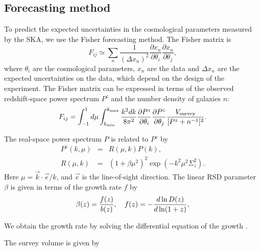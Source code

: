 \documentclass[useAMS,usenatbib]{mn2e}
\begin{document}
\subsection{Forecasting method}

To predict the expected uncertainties in the cosmological parameters measured by the SKA, we use the Fisher forecasting method.
 The Fisher matrix is
\begin{equation}
 F_{ij} \simeq \sum_n \frac{1}{(\Delta x_n)^2}\frac{\partial
    x_n}{\partial \theta_i}\frac{\partial x_n}{\partial
  \theta_j} ,
\end{equation}
where $\theta_i$ are the cosmological parameters, $x_n$ are the data and $\Delta {x_n}$ are  the expected uncertainties on the data, which  depend on the design of the experiment.
The Fisher matrix  can be expressed in terms of the observed redshift-space power spectrum $P^z$ and the number density of galaxies $n$:
\begin{eqnarray}  
F_{ij}=
\int_{-1}^{1}d\mu \int_{k_{\rm min}}^{{k_{\rm max}}} {k^2dk\over 8\pi^2} \frac{\partial  P^z}{\partial \theta_i} \frac{\partial P^z}{\partial \theta_j}
{V_{\rm survey}\over [P^z+n^{-1}]^2}.
 \label{eq:Fij}
\end{eqnarray}

The real-space power spectrum $P$ is related to $P^z$ by
\begin{eqnarray}
P^z(k,\mu)&=& R(\mu,k)P(k),\\
R(\mu,k)& =& (1+\beta\mu^2)^2\exp{\left(-k^2\mu^2\Sigma_z^2 \right)}.\label{eq:Rsig}
\end{eqnarray}
Here $\mu=\vec{k}\cdot\vec{e}/k$, and $\vec{e}$ is the line-of-sight direction. 
The linear RSD parameter $\beta$ is given in terms of the growth rate $f$ by \citep{Komatsu:2008hk}
\begin{equation}
     \beta(z)=\frac{f(z)}{ b(z)},~~~f(z)=-{d\ln D(z) \over d\ln (1+z)},
\end{equation}

We obtain the growth rate by solving the differential equation of the growth \citep{Komatsu:2008hk}.

The survey volume is given by
\end{document}
